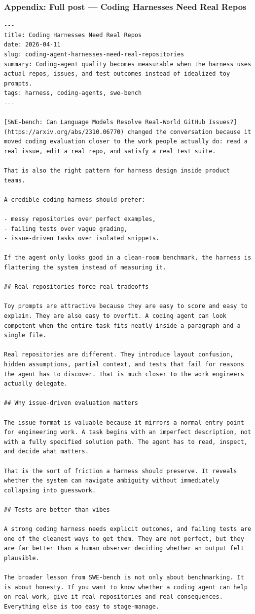 \documentclass[aspectratio=169]{beamer}
\begin{document}
\begin{frame}[fragile]
\frametitle{Appendix: Full post — Coding Harnesses Need Real Repos}
\begin{verbatim}
---
title: Coding Harnesses Need Real Repos
date: 2026-04-11
slug: coding-agent-harnesses-need-real-repositories
summary: Coding-agent quality becomes measurable when the harness uses actual repos, issues, and test outcomes instead of idealized toy prompts.
tags: harness, coding-agents, swe-bench
---

[SWE-bench: Can Language Models Resolve Real-World GitHub Issues?](https://arxiv.org/abs/2310.06770) changed the conversation because it moved coding evaluation closer to the work people actually do: read a real issue, edit a real repo, and satisfy a real test suite.

That is also the right pattern for harness design inside product teams.

A credible coding harness should prefer:

- messy repositories over perfect examples,
- failing tests over vague grading,
- issue-driven tasks over isolated snippets.

If the agent only looks good in a clean-room benchmark, the harness is flattering the system instead of measuring it.

## Real repositories force real tradeoffs

Toy prompts are attractive because they are easy to score and easy to explain. They are also easy to overfit. A coding agent can look competent when the entire task fits neatly inside a paragraph and a single file.

Real repositories are different. They introduce layout confusion, hidden assumptions, partial context, and tests that fail for reasons the agent has to discover. That is much closer to the work engineers actually delegate.

## Why issue-driven evaluation matters

The issue format is valuable because it mirrors a normal entry point for engineering work. A task begins with an imperfect description, not with a fully specified solution path. The agent has to read, inspect, and decide what matters.

That is the sort of friction a harness should preserve. It reveals whether the system can navigate ambiguity without immediately collapsing into guesswork.

## Tests are better than vibes

A strong coding harness needs explicit outcomes, and failing tests are one of the cleanest ways to get them. They are not perfect, but they are far better than a human observer deciding whether an output felt plausible.

The broader lesson from SWE-bench is not only about benchmarking. It is about honesty. If you want to know whether a coding agent can help on real work, give it real repositories and real consequences. Everything else is too easy to stage-manage.
\end{verbatim}
\end{frame}
\end{document}

